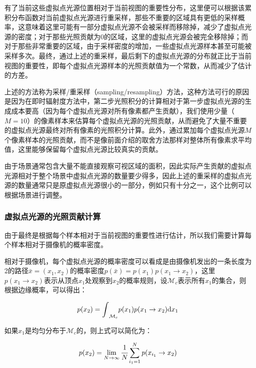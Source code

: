 有了当前这些虚拟点光源位置相对于当前视图的重要性分布，这里便可以根据该累积分布函数对当前虚拟点光源进行重采样，那些不重要的区域具有更低的采样概率，这意味着这里可能有一部分虚拟点光源不会被采样而移除掉，减少了虚拟点光源的密度；对于那些光照贡献为0的区域，这里的虚拟点光源会被完全移除掉；而对于那些非常重要的区域，由于采样密度的增加，一些虚拟点光源样本甚至可能被采样多次。最终，通过上述的重采样，最后剩下的虚拟点光源的分布就正比于当前视图的重要性，即每个虚拟点光源样本的光照贡献值为一个常数，从而减少了估计的方差。

上述的方法称为采样/重采样（sampling/resampling）方法，这种方法可行的原因是因为在即时辐射度方法中，第二步光照积分的计算相对于第一步虚拟点光源的生成成本要高（因为每个虚拟点光源对所有像素都产生贡献），我们使用少量（$M=10$）的像素样本来估算每个虚拟点光源的光照贡献，从而避免了大量不重要的虚拟点光源最终对所有像素的光照积分计算。此外，通过累加每个虚拟点光源$M$个像素样本的光照贡献，而不是像前面介绍的取舍方法那样对整体所有像素求平均值，这里能够保留每个虚拟点光源比较真实的贡献。

由于场景通常包含大量不能直接观察可视区域的面积，因此实际产生贡献的虚拟点光源相对于整个场景中虚拟点光源的数量要少得多，因此上述的重采样的虚拟点光源的数量通常只是原虚拟点光源很小的一部分，例如只有十分之一，这个比例可以根据场景进行调整。




\subsubsection{虚拟点光源的光照贡献计算}
由于最终是根据每个样本相对于当前视图的重要性进行估计，所以我们需要计算每个样本相对于摄像机的概率密度。

相对于摄像机，每个虚拟点光源的概率密度可以看成是由摄像机发出的一条长度为2的路径$\bar{x}=(x_1,x_2)$的概率密度$p(\bar{x})=p(x_1)p(x_1\to x_2)$，这里$p(x_1\to x_2)$表示从顶点$x_1$处观察到$x_2$的概率规则，设$\mathcal{M}_c$表示所有$x_1$的集合，则根据边缘概率，可以得出：

\begin{equation}
	p(x_2)={\rm \int}_{\mathcal{M}_c}p(x_1)p(x_1\to x_2){\rm d}x_1
\end{equation}

\noindent 如果$x_1$是均匀分布于$\mathcal{M}_c$的，则上式可以简化为：

\begin{equation}
	p(x_2)=\lim_{N\to\infty} \cfrac{1}{N}\sum^{N}_{i_1=1}p(x_{i_1}\to x_2)
\end{equation}

